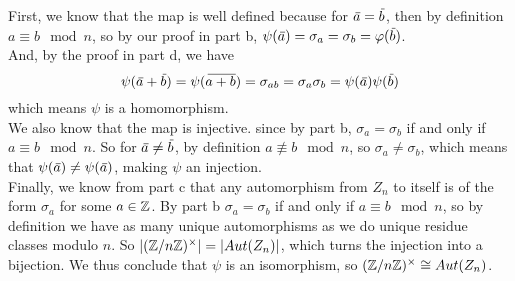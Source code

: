 \documentclass[12pt]{article}
\begin{document}
\begin{enumerate}[label=\textbf{\alph*.}]
            First, we know that the map is well defined
            because for $\,\overline{\!{a}} = \,\overline{\!{b}}$,
            then by definition $a \equiv b \mod n$,
            so by our proof in part b,
            $\psi(\,\overline{\!{a}}) = \sigma_a = \sigma_b = \varphi(\,\overline{\!{b}})$. \\
            And, by the proof in part d, we have
            \[ \psi(\,\overline{\!{a}} + \,\overline{\!{b}})
            = \psi(\,\overline{\!{a + b}})
            = \sigma_{ab}
            = \sigma_{a}\sigma_{b} 
            = \psi(\,\overline{\!{a}})\psi(\,\overline{\!{b}}) \]
            which means $\psi$ is a homomorphism. \\
            We also know that the map is injective.
            since by part b, $\sigma_a = \sigma_b$
            if and only if $a \equiv b \mod n$.
            So for $\,\overline{\!{a}} \neq \,\overline{\!{b}}$,
            by definition $a \not\equiv b \mod n$,
            so $\sigma_a \neq \sigma_b$,
            which means that $\psi(\,\overline{\!{a}}) \neq \psi(\,\overline{\!{a}})$,
            making $\psi$ an injection. \\
            Finally, we know from part c that any automorphism
            from $Z_n$ to itself is of the form $\sigma_a$
            for some $a \in \mathbb{Z}$.
            By part b $\sigma_a = \sigma_b$
            if and only if $a \equiv b \mod n$,
            so by definition we have as many
            unique automorphisms as we do unique residue classes
            modulo $n$.
            So $|(\mathbb{Z}/n\mathbb{Z})^\times| = |Aut(Z_n)|$,
            which turns the injection into a bijection.
            We thus conclude that $\psi$ is an isomorphism,
            so $(\mathbb{Z}/n\mathbb{Z})^\times \cong Aut(Z_n)$.
    \end{enumerate}
\end{document}
